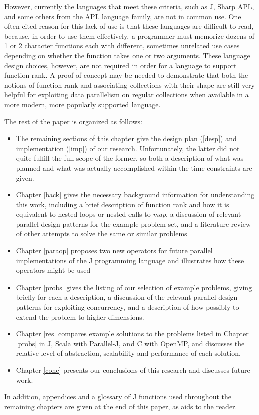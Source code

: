 However, currently the languages that meet these criteria, 
such as J, Sharp APL, and some others from the APL language family, 
are not in common use. 
One often-cited reason for this lack of use is that these languages are difficult to read, %
because, in order to use them effectively, a programmer must memorize 
dozens of 1 or 2 character functions each with different, sometimes unrelated use cases 
depending on whether the function takes one or two arguments\cite{jvocab}\cite{dapl}. 
These language design choices, however, 
are not required in order for a language to support function rank.
A proof-of-concept may be needed 
to demonstrate that both the notions of function rank
and associating collections with their shape
are still very helpful for exploiting data parallelism on regular collections 
when available in a more modern, more popularly supported language.

The rest of the paper is organized as follows:
\begin{itemize} 
	\item The remaining sections of this chapter give the design plan (\ref{desp}) and implementation (\ref{imp}) of our research. 
	Unfortunately, the latter did not quite fulfill the full scope of the former, 
	so both a description of what was planned and what was actually accomplished within the time constraints are given.
	\item Chapter \ref{back} gives the necessary background information for understanding this work, 
	including a brief description of function rank and how it is equivalent to nested loops or nested calls to \textit{map},
	a discussion of relevant parallel design patterns for the example problem set, 
	and a literature review of other attempts to solve the same or similar problems
	\item Chapter \ref{paraop} proposes two new operators for future parallel implementations of the J programming language 
		and illustrates how these operators might be used
    \item Chapter \ref{probs} gives the listing of our selection of example problems, giving briefly for each a description, a discussion of the relevant parallel design patterns for exploiting concurrency, and a description of how possibly to extend the problem to higher dimensions.
    \item Chapter \ref{res} compares example solutions to the problems listed in Chapter \ref{probs} 
		in J, Scala with Parallel-J, and C with OpenMP, 
		and discusses the relative level of abstraction, scalability and performance of each solution. 
    \item Chapter \ref{conc} presents our conclusions of this research and discusses future work. 
\end{itemize}
\noindent
In addition, appendices and a glossary of J functions used throughout the remaining chapters 
are given at the end of this paper, as aids to the reader.

